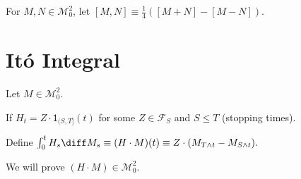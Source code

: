 For $M,N \in \mathcal{M}_0^2$, let $[M,N] \equiv \frac{1}{4}\left( [M+N] - [M-N] \right).$


\section{It\'o Integral}
Let $M \in \mathcal{M}_0^2.$ 

If $H_t = Z \cdot \mathsf{1}_{(S,T]}(t)$ for some $Z \in \mathcal{F}_S$ and $S \leq T$ (stopping times).

Define $\int_{0}^{t} H_s \diff M_s \equiv(H\cdot M)(t) \equiv Z\cdot(M_{T \wedge t} -M_{S \wedge t}).$

We will prove $(H \cdot M) \in \mathcal{M}_0^2.$

